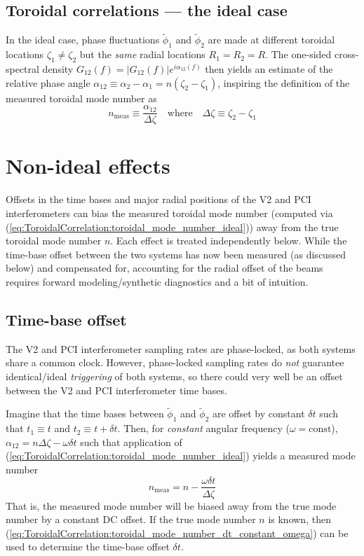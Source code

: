 \subsection{Toroidal correlations --- the ideal case}
In the ideal case, phase fluctuations $\tilde{\phi}_1$ and $\tilde{\phi}_2$
are made at different toroidal locations $\zeta_1 \neq \zeta_2$ but
the \emph{same} radial locations $R_1 = R_2 = R$.
The one-sided cross-spectral density
$G_{12}(f) = |G_{12}(f)| e^{i \alpha_{12}(f)}$
then yields an estimate of the relative phase angle
$\alpha_{12} \equiv \alpha_2 - \alpha_1 = n(\zeta_2 - \zeta_1)$,
inspiring the definition of the measured toroidal mode number as
\begin{equation}
  n_{\text{meas}}
  \equiv
  \frac{\alpha_{12}}{\Delta \zeta}
  \quad \text{where} \quad
  \Delta \zeta \equiv \zeta_2 - \zeta_1
  \label{eq:ToroidalCorrelation:toroidal_mode_number_ideal}
\end{equation}


\section{Non-ideal effects}
Offsets in the time bases and major radial positions
of the V2 and PCI interferometers can bias
the measured toroidal mode number
(computed via (\ref{eq:ToroidalCorrelation:toroidal_mode_number_ideal}))
away from the true toroidal mode number $n$.
Each effect is treated independently below.
While the time-base offset between the two systems
has now been measured (as discussed below) and compensated for,
accounting for the radial offset of the beams requires
forward modeling/synthetic diagnostics and a bit of intuition.


\subsection{Time-base offset}
The V2 and PCI interferometer sampling rates are phase-locked,
as both systems share a common clock.
However, phase-locked sampling rates do \emph{not} guarantee
identical/ideal \emph{triggering} of both systems, so
there could very well be an offset between the
V2 and PCI interferometer time bases.

Imagine that the time bases between $\tilde{\phi}_1$ and $\tilde{\phi}_2$
are offset by constant $\delta t$ such that
$t_1 \equiv t$ and $t_2 \equiv t + \delta t$.
Then, for \emph{constant} angular frequency ($\omega = \text{const}$),
$\alpha_{12} = n \Delta \zeta - \omega \delta t$
such that application of
(\ref{eq:ToroidalCorrelation:toroidal_mode_number_ideal})
yields a measured mode number
\begin{equation}
  n_{\text{meas}} = n - \frac{\omega \delta t}{\Delta \zeta}
  \label{eq:ToroidalCorrelation:toroidal_mode_number_dt_constant_omega}
\end{equation}
That is, the measured mode number will be biased away from
the true mode number by a constant DC offset.
If the true mode number $n$ is known,
then (\ref{eq:ToroidalCorrelation:toroidal_mode_number_dt_constant_omega})
can be used to determine the time-base offset $\delta t$.

